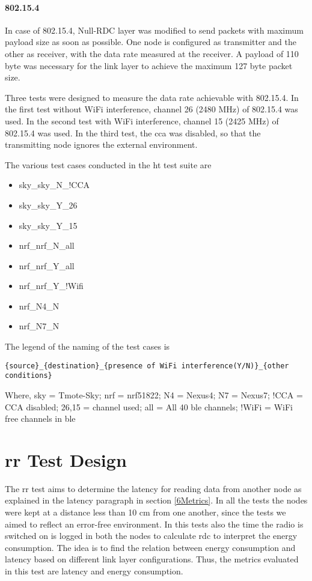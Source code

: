 \paragraph{802.15.4} In case of 802.15.4, Null-RDC layer was modified to send packets with maximum payload size as soon as possible. One node is configured as transmitter and the other as receiver, with the data rate measured at the receiver. A payload of 110 byte was necessary for the link layer to achieve the maximum 127 byte packet size.

Three tests were designed to measure the data rate achievable with 802.15.4. In the first test without WiFi interference, channel 26 (2480 MHz) of 802.15.4 was used. In the second test with WiFi interference, channel 15 (2425 MHz) of 802.15.4 was used. In the third test, the \gls{cca} was disabled, so that the transmitting node ignores the external environment.

The various test cases conducted in the \gls{ht} test suite are 
\vspace{-5 pt}
\begin{multicols}{2}
\begin{itemize} \itemsep1pt \parskip0pt 
\item sky\_sky\_N\_!CCA
\item sky\_sky\_Y\_26
\item sky\_sky\_Y\_15
\item nrf\_nrf\_N\_all
\item nrf\_nrf\_Y\_all
\item nrf\_nrf\_Y\_!Wifi
\item nrf\_N4\_N
\item nrf\_N7\_N
\end{itemize}
\end{multicols}


The legend of the naming of the test cases is

\texttt{\{source\}\_\{destination\}\_\{presence of WiFi interference(Y/N)\}\_\{other conditions\}}

Where,
sky = Tmote-Sky;	nrf = nrf51822;	N4 = Nexus4; 		N7 = Nexus7;
!CCA = CCA disabled; 26,15 = channel used; all = All 40 \gls{ble}  channels;	!WiFi = WiFi free channels in \gls{ble} 


\section{\acrfull{rr} Test Design} \label{6RRdesign}
The \gls{rr} test aims to determine the latency for reading data from another node as explained in the latency paragraph in section \ref{6Metrics}. In all the tests the nodes were kept at a distance less than 10 cm from one another, since the tests we aimed to reflect an error-free environment. In this tests also the time the radio is switched on is logged in both the nodes to calculate \gls{rdc} to interpret the energy consumption. The idea is to find the relation between energy consumption and latency based on different link layer configurations. Thus, the metrics evaluated in this test are latency and energy consumption.

